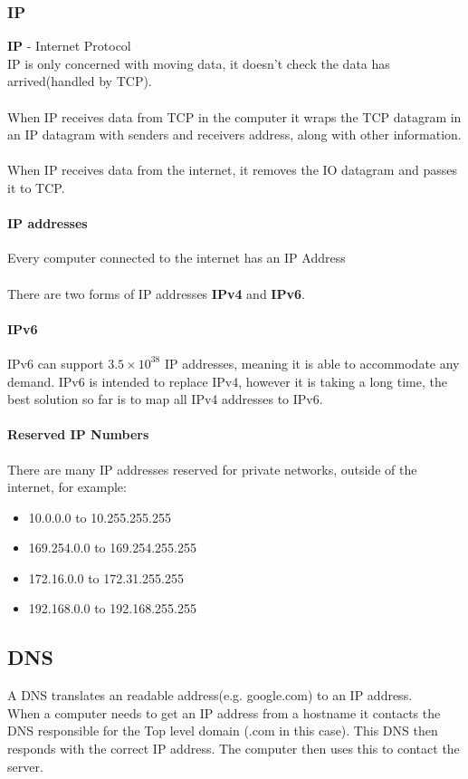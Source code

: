 \documentclass{article}[18pt]
\begin{document}
\subsubsection{IP}
\textbf{IP} - Internet Protocol\\
IP is only concerned with moving data, it doesn't check the data has arrived(handled by TCP).\\
\\
When IP receives data from TCP in the computer it wraps the TCP datagram in an IP datagram with senders and receivers address, along with other information.\\
\\
When IP receives data from the internet, it removes the IO datagram and passes it to TCP.
\paragraph{IP addresses}
Every computer connected to the internet has an IP Address\\
\\
There are two forms of IP addresses \textbf{IPv4} and \textbf{IPv6}.
\paragraph{IPv6}
IPv6 can support $3.5\times10^{38}$ IP addresses, meaning it is able to accommodate any demand. IPv6 is intended to replace IPv4, however it is taking a long time, the best solution so far is to map all IPv4 addresses to IPv6.
\paragraph{Reserved IP Numbers}
There are many IP addresses reserved for private networks, outside of the internet, for example:
\begin{itemize}
\item 10.0.0.0 to 10.255.255.255
\item 169.254.0.0 to 169.254.255.255
\item 172.16.0.0 to 172.31.255.255
\item 192.168.0.0 to 192.168.255.255
\end{itemize}
\subsection{DNS}
A DNS translates an readable address(e.g. google.com) to an IP address.\\
When a computer needs to get an IP address from a hostname it contacts the DNS responsible for the Top level domain (.com in this case). This DNS then responds with the correct IP address. The computer then uses this to contact the server. 
\end{document}
